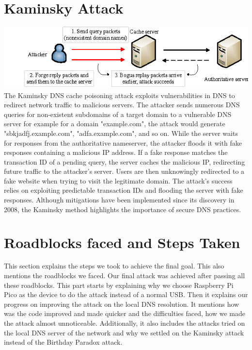 \documentclass[11pt]{report}
\begin{document}
\section*{Kaminsky Attack}

\includegraphics[width=15cm]{Figures/kaminsky.png}\\
The Kaminsky DNS cache poisoning attack exploits vulnerabilities in DNS to redirect network traffic to malicious servers. The attacker sends numerous DNS queries for non-existent subdomains of a target domain to a vulnerable DNS server for example for a domain "example.com", the attack would generate "sbkjadfj.example.com", "adfa.example.com", and so on. While the server waits for responses from the authoritative nameserver, the attacker floods it with fake responses containing a malicious IP address. If a fake response matches the transaction ID of a pending query, the server caches the malicious IP, redirecting future traffic to the attacker's server. Users are then unknowingly redirected to a fake website when trying to visit the legitimate domain. The attack's success relies on exploiting predictable transaction IDs and flooding the server with fake responses. Although mitigations have been implemented since its discovery in 2008, the Kaminsky method highlights the importance of secure DNS practices.


\section*{Roadblocks faced and Steps Taken}

This section explains the steps we took to achieve the final goal. This also
mentions the roadblocks we faced. Our final attack was achieved after passing
all these roadblocks. This part starts by explaining why we choose Raspberry Pi
Pico as the device to do the attack instead of a normal USB. Then it explains
our progress on improving the attack on the local DNS resolution. It mentions
how was the code improved and made quicker and the difficulties faced, how we
made the attack almost unnoticeable. Additionally, it also includes the attacks
tried on the local DNS server of the network and why we settled on the Kaminsky
attack instead of the Birthday Paradox attack.
\end{document}
